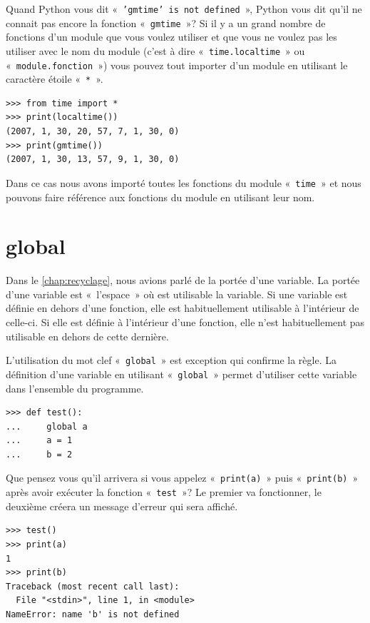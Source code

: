 Quand Python vous dit « \texttt{'gmtime' is not defined} », Python vous dit qu'il ne connait pas encore la fonction « \texttt{gmtime} »? Si il y a un grand nombre de fonctions d'un module que vous voulez utiliser et que vous ne voulez pas les utiliser avec le nom du module (c'est à dire « \texttt{time.localtime} » ou « \texttt{module.fonction} ») vous pouvez tout importer d'un module en utilisant le caractère étoile « \texttt{*} ».   


\begin{Verbatim}[frame=single,rulecolor=\color{gray}]
>>> from time import *
>>> print(localtime())
(2007, 1, 30, 20, 57, 7, 1, 30, 0)
>>> print(gmtime())
(2007, 1, 30, 13, 57, 9, 1, 30, 0)
\end{Verbatim}


Dans ce cas nous avons importé toutes les fonctions du module « \texttt{time} » et nous pouvons faire référence aux fonctions du module en utilisant leur nom.

\section*{global}

Dans le \autoref{chap:recyclage}, nous avions parlé de la portée d'une variable. La portée d'une variable est « l'espace » où est utilisable la variable. Si une variable est définie en dehors d'une fonction, elle est habituellement utilisable à l'intérieur de celle-ci. Si elle est définie à l'intérieur d'une fonction, elle n'est habituellement pas utilisable en dehors de cette dernière. 

L'utilisation du mot clef « \texttt{global} » est exception qui confirme la règle. La définition d'une variable en utilisant « \texttt{global} » permet d'utiliser cette variable dans l'ensemble du programme.

\begin{listing}
\begin{verbatim}
>>> def test():
...     global a
...     a = 1
...     b = 2
\end{verbatim}
\end{listing}

Que pensez vous qu'il arrivera si vous appelez « \texttt{print(a)} » puis « \texttt{print(b)} » après avoir exécuter la fonction « \texttt{test} »? Le premier va fonctionner, le deuxième créera un message d'erreur qui sera affiché.

\begin{Verbatim}[frame=single,rulecolor=\color{gray}]
>>> test()
>>> print(a)
1
>>> print(b)
Traceback (most recent call last):
  File "<stdin>", line 1, in <module>
NameError: name 'b' is not defined
\end{Verbatim}


